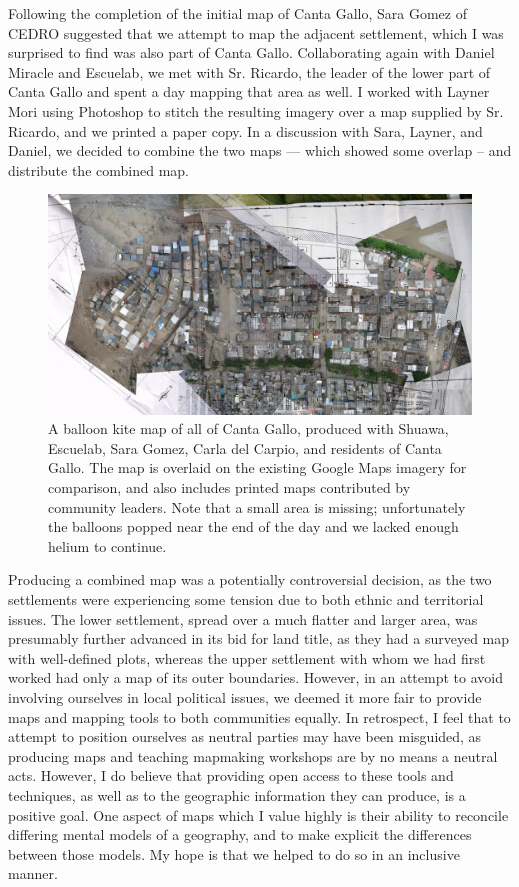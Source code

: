 \documentclass[11pt,oneside,notitlepage]{report}
\begin{document}
Following the completion of the initial map of Canta Gallo, Sara Gomez of \ac{CEDRO} suggested that we attempt to map the adjacent settlement, which I was surprised to find was also part of Canta Gallo. Collaborating again with Daniel Miracle and Escuelab, we met with Sr. Ricardo, the leader of the lower part of Canta Gallo and spent a day mapping that area as well. I worked with Layner Mori using Photoshop to stitch the resulting imagery over a map supplied by Sr. Ricardo, and we printed a paper copy. In a discussion with Sara, Layner, and Daniel, we decided to combine the two maps --- which showed some overlap -- and distribute the combined map. 

\begin{figure}[h]
  \begin{center}
	\includegraphics[width=1\textwidth]{images/cantagallo-combined.jpg}
	\caption{A balloon kite map of all of Canta Gallo, produced with Shuawa, Escuelab, Sara Gomez, Carla del Carpio, and residents of Canta Gallo. The map is overlaid on the existing Google Maps imagery for comparison, and also includes printed maps contributed by community leaders. Note that a small area is missing; unfortunately the balloons popped near the end of the day and we lacked enough helium to continue.}
  \end{center}
\end{figure}

Producing a combined map was a potentially controversial decision, as the two settlements were experiencing some tension due to both ethnic and territorial issues. The lower settlement, spread over a much flatter and larger area, was presumably further advanced in its bid for land title, as they had a surveyed map with well-defined plots, whereas the upper settlement with whom we had first worked had only a map of its outer boundaries. However, in an attempt to avoid involving ourselves in local political issues, we deemed it more fair to provide maps and mapping tools to both communities equally. In retrospect, I feel that to attempt to position ourselves as neutral parties may have been misguided, as producing maps and teaching mapmaking workshops are by no means a neutral acts. However, I do believe that providing open access to these tools and techniques, as well as to the geographic information they can produce, is a positive goal. One aspect of maps which I value highly is their ability to reconcile differing mental models of a geography, and to make explicit the differences between those models. My hope is that we helped to do so in an inclusive manner. 
\end{document}
